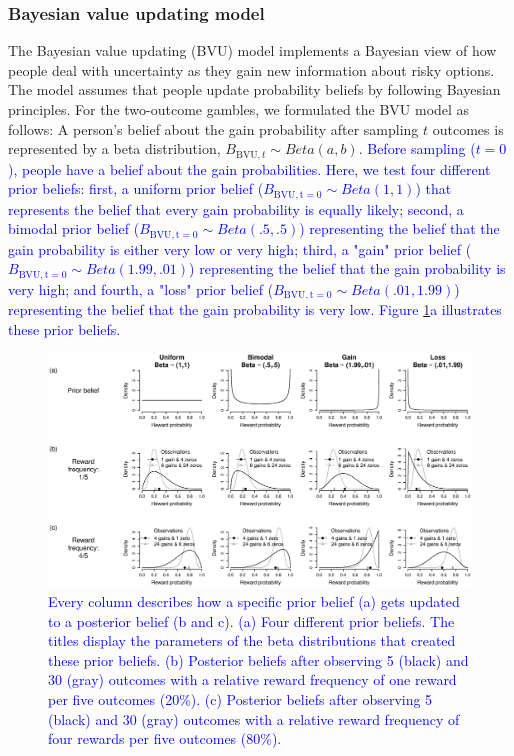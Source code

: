 \documentclass[a4paper, man, natbib, floatsintext]{apa6} %
\begin{document}
\subsubsection{Bayesian value updating model}
The Bayesian value updating (BVU) model implements a Bayesian view of how people deal with uncertainty as they gain new information about risky options. The model assumes that people update probability beliefs by following Bayesian principles. 
For the two-outcome gambles, we formulated the BVU model as follows: A person's belief about the gain probability after sampling $t$ outcomes is represented by a beta distribution, ${B}_{\mathrm{BVU}, t} \sim Beta(a,b)$. \textcolor{blue}{Before sampling ($t = 0$), people have a belief about the gain probabilities. Here, we test four different prior beliefs: first, a uniform prior belief (${B}_\mathrm{BVU, t = 0} \sim Beta(1,1)$) that represents  the belief that every gain probability is equally likely; second, a bimodal prior belief (${B}_\mathrm{BVU, t = 0} \sim Beta(.5,.5)$) representing the belief that the gain probability is either very low or very high; third, a "gain" prior belief (${B}_\mathrm{BVU, t = 0} \sim Beta(1.99, .01)$) representing the belief that the gain probability is very high; and fourth, a "loss" prior belief (${B}_\mathrm{BVU, t = 0} \sim Beta(.01, 1.99)$) representing the belief that the gain probability is very low. Figure \ref{fig:sensi}a illustrates these prior beliefs.}
\begin{figure}[htbp] 
  \centering
\includegraphics[width=1\linewidth, keepaspectratio]{sensi1.eps}
  \caption{\textcolor{blue}{Every column describes how a specific prior belief (a) gets updated to a posterior belief (b and c). (a) Four different prior beliefs. The titles display the parameters of the beta distributions that created these prior beliefs. (b) Posterior beliefs after observing 5 (black) and 30 (gray) outcomes with a relative reward frequency of one reward per five outcomes (20\%). (c) Posterior beliefs after observing 5 (black) and 30 (gray) outcomes with a relative reward frequency of four rewards per five outcomes (80\%).}}
  \label{fig:sensi}
\end{figure}
\end{document}
